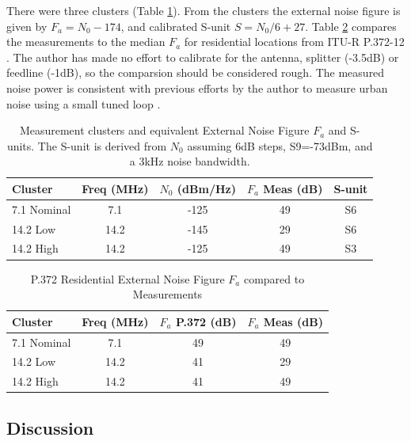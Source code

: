 \documentclass{article}
\begin{document}
There were three clusters (Table \ref{table:measurment_clusters}). From the clusters the external noise figure is given by $F_a = N_0 - 174$, and calibrated S-unit $S=N_0/6+27$. Table \ref{table:external_noise_figure} compares the measurements to the median $F_a$ for residential locations from ITU-R P.372-12 \cite[Fig. 10]{itu372}. The author has made no effort to calibrate for the antenna, splitter (-3.5dB) or feedline (-1dB), so the comparsion should be considered rough.  The measured noise power is consistent with previous efforts by the author to measure urban noise using a small tuned loop \cite{rowetel_noise_city}.

\begin{table}[h]
\centering
\begin{tabular}{l c c c c}
 \hline
 Cluster & Freq (MHz) & $N_0$ (dBm/Hz) & $F_a$ Meas (dB) & S-unit \\
 \hline
 7.1 Nominal & 7.1 & -125 & 49 & S6 \\
 14.2 Low & 14.2 & -145 &  29 & S6 \\
 14.2 High & 14.2 & -125 & 49 & S3 \\
\end{tabular}
\caption{Measurement clusters and equivalent External Noise Figure $F_a$ and S-units.  The S-unit is derived from $N_0$ assuming 6dB steps, S9=-73dBm, and a 3kHz noise bandwidth.}
\label{table:measurment_clusters}
\end{table}

\begin{table}[h]
\centering
\begin{tabular}{l c c c}
 \hline
 Cluster & Freq (MHz) & $F_a$ P.372 (dB) & $F_a$ Meas (dB) \\
 \hline
 7.1 Nominal & 7.1 & 49 & 49 \\
 14.2 Low & 14.2 & 41 &  29 \\
 14.2 High & 14.2 & 41 & 49 \\
\end{tabular}
\caption{P.372 Residential External Noise Figure $F_a$ compared to Measurements}
\label{table:external_noise_figure}
\end{table}

\subsection{Discussion}
\end{document}
